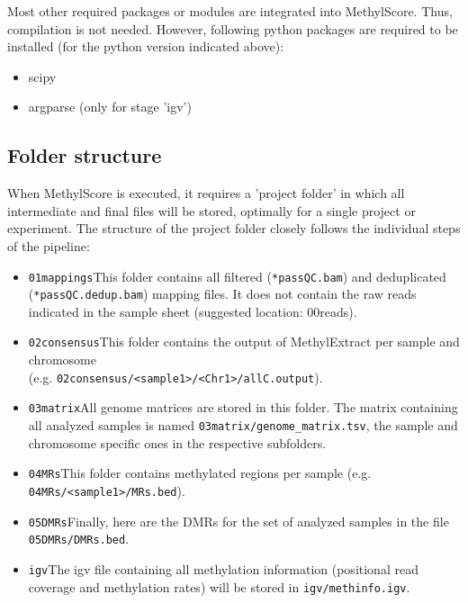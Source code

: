 \documentclass{article}
\begin{document}
Most other required packages or modules are integrated into MethylScore. Thus, compilation is not needed. However, following python packages are required to be installed (for the python version indicated above):
\begin{itemize}
	\item scipy 
	\item argparse (only for stage 'igv')
\end{itemize}

\subsection{Folder structure}
\label{folder_structure}

When MethylScore is executed, it requires a 'project folder' in which all intermediate and final files will be stored, optimally for a single project or experiment. The structure of the project folder closely follows the individual steps of the pipeline:

\begin{itemize}
	\item \verb|01mappings|\newline\indent This folder contains all filtered (\verb|*passQC.bam|) and deduplicated (\verb|*passQC.dedup.bam|) mapping files. It does not contain the raw reads indicated in the sample sheet (suggested location: 00reads).
	\item \verb|02consensus|\newline\indent This folder contains the output of MethylExtract per sample and chromosome\\(e.g. \verb|02consensus/<sample1>/<Chr1>/allC.output|).
	\item \verb|03matrix|\newline\indent All genome matrices are stored in this folder. The matrix containing all analyzed samples is named \verb|03matrix/genome_matrix.tsv|, the sample and chromosome specific ones in the respective subfolders.
	\item \verb|04MRs|\newline\indent This folder contains methylated regions per sample (e.g. \verb|04MRs/<sample1>/MRs.bed|).
	\item \verb|05DMRs|\newline\indent Finally, here are the DMRs for the set of analyzed samples in the file \verb|05DMRs/DMRs.bed|.
	\item \verb|igv|\newline\indent The igv file containing all methylation information (positional read coverage and methylation rates) will be stored in \verb|igv/methinfo.igv|.
\end{itemize}
\end{document}
